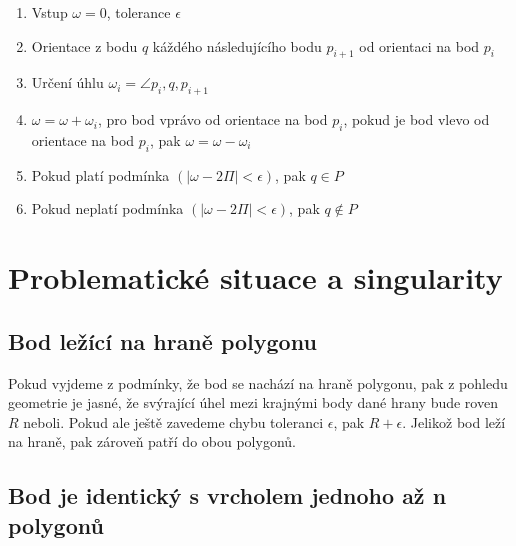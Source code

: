 \documentclass{article}
\begin{document}
\begin{enumerate} 

\item Vstup $\omega = 0$, tolerance $\epsilon$

\item Orientace z bodu $q$ káždého následujícího bodu  $p_{i+1}$ od orientaci na bod $p_i$

\item Určení úhlu $\omega_i = \angle p_i, q, p_{i+1}$ 

\item  $\omega = \omega + \omega_i$, pro bod vprávo od orientace na bod $p_i$, pokud je bod vlevo od orientace na bod $p_i$, pak $\omega = \omega - \omega_i$

\item Pokud platí podmínka $(\left|\omega - 2\Pi \right| < \epsilon)$, pak $q \in P$

\item Pokud neplatí podmínka  $(\left|\omega - 2\Pi \right| < \epsilon)$, pak $q \notin P$

\end{enumerate} 
\clearpage
\newpage
\section{Problematické situace a singularity} %
\subsection{Bod ležící na hraně polygonu} 

\bigskip 

Pokud vyjdeme z podmínky, že bod se nachází na hraně polygonu, pak z pohledu geometrie je jasné, že svýrající úhel mezi krajnými body dané hrany bude roven $R$ neboli. Pokud ale ještě zavedeme chybu toleranci $\epsilon$, pak $R+\epsilon$. Jelikož bod leží na hraně, pak zároveň patří do obou polygonů.

\subsection{Bod je identický s vrcholem jednoho až n polygonů} 

\bigskip 
\end{document}
